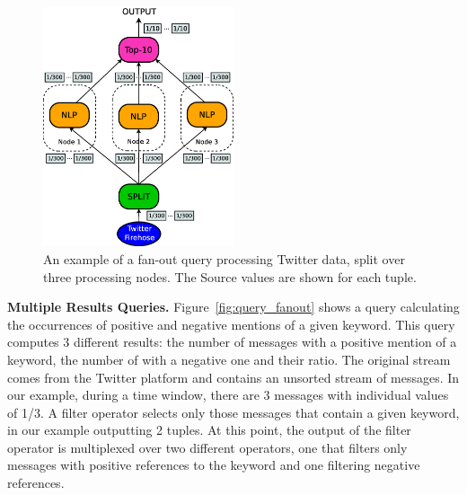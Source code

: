 \begin{figure}[t!]
	\centering 
	\includegraphics[width=0.5\textwidth]{img/tesi/fan-out_mr} 
	\caption{An example of a fan-out query processing Twitter data, split over three processing nodes. 
	The Source \DIFdelbeginFL {}\DIFdelendFL \DIFaddbeginFL {}\DIFaddendFL values are shown for each tuple.}
	\label{fig:fanout_mr}
\end{figure}
\vspace{15pt}
\textbf{Multiple Results Queries.} Figure~\ref{fig:query_fanout} shows a query calculating the
occurrences of positive and negative mentions of a given keyword. 
This query computes 3 different results: the number of messages with a positive mention of a keyword,
the number of with a negative one and their ratio.
The original stream comes from the Twitter platform and contains an unsorted stream of messages. In our
example, during a time window, there are 3 messages with individual \sic values of 1/3. A filter
operator selects only those messages that contain a given keyword, in our example outputting 2
tuples.
At this point, the output of the filter operator is multiplexed over two different operators,
one that filters only messages with positive references to the keyword and one filtering negative
references.
\clearpage
\DIFdelbegin %
